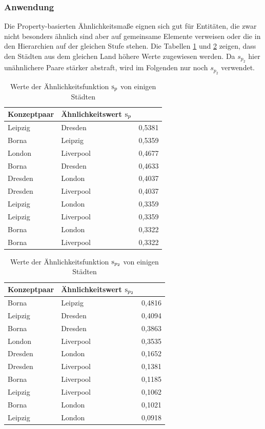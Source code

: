 \subsubsection{Anwendung}
Die Property-basierten Ähnlichkeitsmaße eignen sich gut für Entitäten, die zwar nicht besonders ähnlich sind aber auf gemeinsame Elemente verweisen oder die in den Hierarchien auf der gleichen Stufe stehen.
Die Tabellen \ref{tab:aehnlichkeitsmass-semantisch-properties-version1} und \ref{tab:aehnlichkeitsmass-semantisch-properties-version2} zeigen, dass den Städten aus dem gleichen Land höhere Werte zugewiesen werden.
Da $s_{p_2}$ hier unähnlichere Paare stärker abstraft, wird im Folgenden nur noch $s_{p_2}$ verwendet.

\begin{table}
\begin{tabular}{lll}
\toprule
Konzeptpaar					&Ähnlichkeitswert $\textnormal{s}_{p}$\\
\midrule
Leipzig		&Dresden		&0,5381\\
Borna		&Leipzig		&0,5359\\
London		&Liverpool		&0,4677\\
Borna		&Dresden		&0,4633\\
Dresden		&London		&0,4037\\
Dresden		&Liverpool		&0,4037\\
Leipzig		&London		&0,3359\\
Leipzig		&Liverpool		&0,3359\\
Borna		&London		&0,3322\\
Borna		&Liverpool		&0,3322\\
\bottomrule
\end{tabular}
\caption{Werte der Ähnlichkeitsfunktion $\textnormal{s}_{p}$ von einigen Städten}
\label{tab:aehnlichkeitsmass-semantisch-properties-version1}
\end{table}


\begin{table}
\begin{tabular}{lll}
\toprule
Konzeptpaar					&Ähnlichkeitswert $\textnormal{s}_{p_2}$\\
\midrule
Borna		&Leipzig		&0,4816\\
Leipzig		&Dresden		&0,4094\\
Borna		&Dresden		&0,3863\\
London		&Liverpool		&0,3535\\
Dresden		&London		&0,1652\\
Dresden		&Liverpool		&0,1381\\
Borna		&Liverpool		&0,1185\\
Leipzig		&Liverpool		&0,1062\\
Borna		&London		&0,1021\\
Leipzig		&London		&0,0918\\
\bottomrule
\end{tabular}
\caption{Werte der Ähnlichkeitsfunktion $\textnormal{s}_{p_2}$ von einigen Städten}
\label{tab:aehnlichkeitsmass-semantisch-properties-version2}
\end{table}

